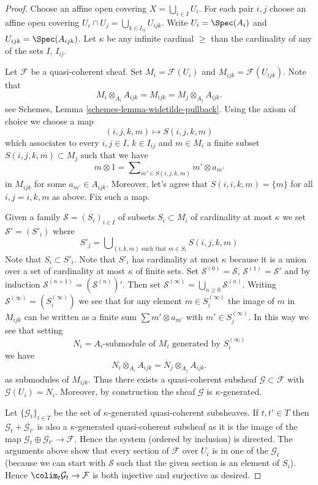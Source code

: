 \begin{proof}
Choose an affine open covering $X = \bigcup_{i \in I} U_i$. For each pair
$i, j$ choose an affine open covering
$U_i \cap U_j = \bigcup_{k \in I_{ij}} U_{ijk}$.
Write $U_i = \Spec(A_i)$ and $U_{ijk} = \Spec(A_{ijk})$.
Let $\kappa$ be any infinite cardinal $\geq$ than the cardinality
of any of the sets $I$, $I_{ij}$.

\medskip\noindent
Let $\mathcal{F}$ be a quasi-coherent sheaf. Set $M_i = \mathcal{F}(U_i)$
and $M_{ijk} = \mathcal{F}(U_{ijk})$. Note that
$$
M_i \otimes_{A_i} A_{ijk} = M_{ijk} = M_j \otimes_{A_j} A_{ijk}.
$$
see
Schemes, Lemma \ref{schemes-lemma-widetilde-pullback}.
Using the axiom of choice we choose a map
$$
(i, j, k, m) \mapsto S(i, j, k, m)
$$
which associates to every $i, j \in I$, $k \in I_{ij}$ and $m \in M_i$
a finite subset $S(i, j, k, m) \subset M_j$ such that we have
$$
m \otimes 1 = \sum\nolimits_{m' \in S(i, j, k, m)} m' \otimes a_{m'}
$$
in $M_{ijk}$ for some $a_{m'} \in A_{ijk}$. Moreover, let's agree
that $S(i, i, k, m) = \{m\}$ for all $i, j = i, k, m$ as above.
Fix such a map.

\medskip\noindent
Given a family $\mathcal{S} = (S_i)_{i \in I}$ of subsets
$S_i \subset M_i$ of cardinality at most $\kappa$ we set
$\mathcal{S}' = (S'_i)$ where
$$
S'_j = \bigcup\nolimits_{(i, k, m)\text{ such that }m \in S_i}
S(i, j, k, m)
$$
Note that $S_i \subset S'_i$. Note that $S'_i$ has cardinality at most
$\kappa$ because it is a union over a set of cardinality at most $\kappa$
of finite sets. Set $\mathcal{S}^{(0)} = \mathcal{S}$,
$\mathcal{S}^{(1)} = \mathcal{S}'$ and by induction
$\mathcal{S}^{(n + 1)} = (\mathcal{S}^{(n)})'$. Then set
$\mathcal{S}^{(\infty)} = \bigcup_{n \geq 0} \mathcal{S}^{(n)}$.
Writing $\mathcal{S}^{(\infty)} = (S^{(\infty)}_i)$ we see that
for any element $m \in S^{(\infty)}_i$ the image of $m$ in
$M_{ijk}$ can be written as a finite sum $\sum m' \otimes a_{m'}$
with $m' \in S_j^{(\infty)}$. In this way we see that setting
$$
N_i = A_i\text{-submodule of }M_i\text{ generated by }S^{(\infty)}_i
$$
we have
$$
N_i \otimes_{A_i} A_{ijk} = N_j \otimes_{A_j} A_{ijk}.
$$
as submodules of $M_{ijk}$. Thus there exists a quasi-coherent subsheaf
$\mathcal{G} \subset \mathcal{F}$ with $\mathcal{G}(U_i) = N_i$.
Moreover, by construction the sheaf $\mathcal{G}$ is $\kappa$-generated.

\medskip\noindent
Let $\{\mathcal{G}_t\}_{t \in T}$ be the set of $\kappa$-generated
quasi-coherent subsheaves. If $t, t' \in T$ then
$\mathcal{G}_t + \mathcal{G}_{t'}$ is also a $\kappa$-generated
quasi-coherent subsheaf as it is the image of the map
$\mathcal{G}_t \oplus \mathcal{G}_{t'} \to \mathcal{F}$.
Hence the system (ordered by inclusion) is directed.
The arguments above show that every section of $\mathcal{F}$ over $U_i$
is in one of the $\mathcal{G}_t$ (because we can start with $\mathcal{S}$
such that the given section is an element of $S_i$). Hence
$\colim_t \mathcal{G}_t \to \mathcal{F}$ is both injective and surjective
as desired.
\end{proof}

